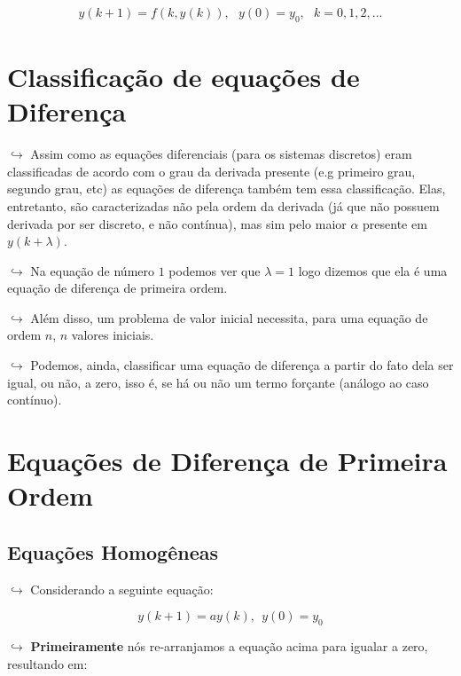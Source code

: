 \documentclass{article}
\begin{document}
\begin{itemize}
\[
\begin{align}y(k + 1) = f(k, y(k)), \ \ \ y(0) = y_0,  \ \ \ k = 0, 1, 2, ...
\end{align}
\]

\hypertarget{classificauxe7uxe3o-de-equauxe7uxf5es-de-diferenuxe7a}{%
\section{Classificação de equações de
Diferença}\label{classificauxe7uxe3o-de-equauxe7uxf5es-de-diferenuxe7a}}

\(\hookrightarrow\) Assim como as equações diferenciais (para os
sistemas discretos) eram classificadas de acordo com o grau da derivada
presente (e.g primeiro grau, segundo grau, etc) as equações de diferença
também tem essa classificação. Elas, entretanto, são caracterizadas não
pela ordem da derivada (já que não possuem derivada por ser discreto, e
não contínua), mas sim pelo maior \(\alpha\) presente em
\(y(k+\lambda)\).

\(\hookrightarrow\) Na equação de número \(1\) podemos ver que
\(\lambda = 1\) logo dizemos que ela é uma equação de diferença de
primeira ordem.

\(\hookrightarrow\) Além disso, um problema de valor inicial necessita,
para uma equação de ordem \(n\), \(n\) valores iniciais.

\(\hookrightarrow\) Podemos, ainda, classificar uma equação de diferença
a partir do fato dela ser igual, ou não, a zero, isso é, se há ou não um
termo forçante (análogo ao caso contínuo).

\hypertarget{equauxe7uxf5es-de-diferenuxe7a-de-primeira-ordem}{%
\section{Equações de Diferença de Primeira
Ordem}\label{equauxe7uxf5es-de-diferenuxe7a-de-primeira-ordem}}

\hypertarget{equauxe7uxf5es-homoguxeaneas}{%
\subsection{Equações Homogêneas}\label{equauxe7uxf5es-homoguxeaneas}}

\(\hookrightarrow\) Considerando a seguinte equação:

\[
y(k+1) = a y(k), \ \ y(0) = y_0
\]

\(\hookrightarrow\) \textbf{Primeiramente} nós re-arranjamos a equação
acima para igualar a zero, resultando em:


\end{itemize}
\end{document}
